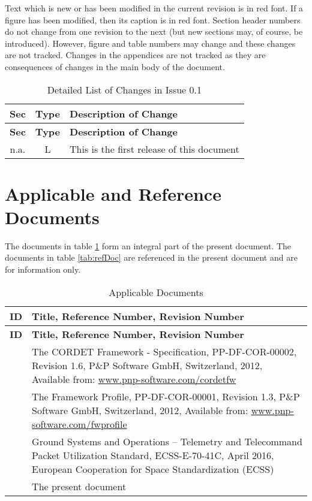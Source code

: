 \documentclass{pnp_article}
\begin{document}
Text which is new or has been modified in the current revision is in red font. If a figure has been modified, then its caption is in red font. Section header numbers do not change from one revision to the next (but new sections may, of course, be introduced). However, figure and table numbers may change and these changes are not tracked. Changes in the appendices are not tracked as they are consequences of changes in the main body of the document.

\begin{longtable}{|c|c|p{10cm}|}
\caption{Detailed List of Changes in Issue 0.1} \\
\hline
\rowcolor{light-gray}
\textbf{Sec} & \textbf{Type} & \textbf{Description of Change} \\
\hline\hline
\endfirsthead
\rowcolor{light-gray}
\textbf{Sec} & \textbf{Type} & \textbf{Description of Change} \\
\hline\hline
\endhead
n.a. & L & This is the first release of this document \\
\hline
\end{longtable}






\newpage

\section{Applicable and Reference Documents}

The documents in table \ref{tab:appDoc} form an integral part of the present document. The documents in table \ref{tab:refDoc} are referenced in the present document and are for information only.

\begin{longtable}{|c|p{11cm}|}
\caption{Applicable Documents} \label{tab:appDoc}\\
\hline
\rowcolor{light-gray}
\textbf{ID} & \textbf{Title, Reference Number, Revision Number} \\
\hline\hline
\endfirsthead
\rowcolor{light-gray}
\textbf{ID} & \textbf{Title, Reference Number, Revision Number} \\
\hline\hline
\endhead
[CR-SP] & The CORDET Framework - Specification, PP-DF-COR-00002, Revision 1.6, P\&P Software GmbH, Switzerland, 2012, Available from: \url{www.pnp-software.com/cordetfw} \\
\hline
[FW-SP] & The Framework Profile, PP-DF-COR-00001, Revision 1.3, P\&P Software GmbH, Switzerland, 2012, Available from: \url{www.pnp-software.com/fwprofile} \\
\hline
[PS-SP] & Ground Systems and Operations – Telemetry and Telecommand Packet Utilization Standard, ECSS-E-70-41C, April 2016, European Cooperation for Space Standardization (ECSS) \\
\hline
[PX-SP] & The present document \\
\hline
\end{longtable}
\end{document}
